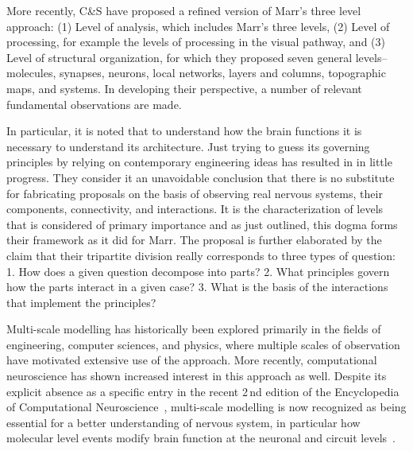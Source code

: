 \documentclass{article}
\begin{document}
More recently, C\&S have proposed a refined version of Marr's three level approach: (1) Level of analysis, which includes Marr’s three levels, (2) Level of processing, for example the levels of processing in the visual pathway, and (3) Level of structural organization, for which they proposed seven general levels–molecules, synapses, neurons, local networks, layers and columns, topographic maps, and systems. In developing their perspective, a number of relevant fundamental observations are made.

In particular, it is noted that to understand how the brain functions it is necessary to understand its architecture. Just trying to guess its governing principles by relying on contemporary engineering ideas has resulted in in little progress. They consider it an unavoidable conclusion that there is no substitute for fabricating proposals on the basis of observing real nervous systems, their components, connectivity, and interactions. It is the characterization of levels that is considered of primary importance and as just outlined, this dogma forms their framework as it did for Marr. The proposal is further elaborated by the claim that their tripartite division really corresponds to three types of question: 1. How does a given question decompose into parts? 2. What principles govern how the parts interact in a given case? 3. What is the basis of the interactions that implement the principles?

Multi-scale modelling has historically been explored primarily in the fields of engineering, computer sciences, and physics, where multiple scales of observation have motivated extensive use of the approach. More recently, computational neuroscience has shown increased interest in this approach as well. Despite its explicit absence as a specific entry in the recent 2\,nd edition of the Encyclopedia of Computational Neuroscience~\cite{jung22}, multi-scale modelling is now recognized as being essential for a better understanding of nervous system, in particular how molecular level events modify brain function at the neuronal and circuit levels~\cite{bouteiller11}.
\end{document}
